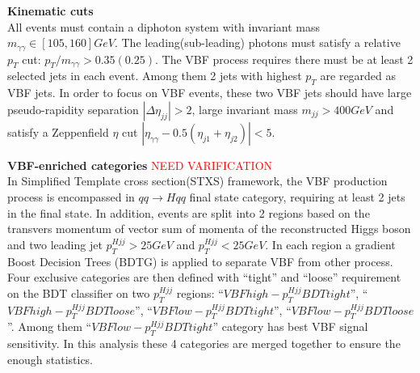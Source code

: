 \begin{description}
\item{\textbf{Kinematic cuts}} \\
All events must contain a diphoton system with invariant mass $m_{\gamma\gamma}\in[105, 160]GeV$. The leading(sub-leading) photons must satisfy a relative $p_{T}$ cut: $p_{T}/m_{\gamma\gamma}>0.35(0.25)$. 
The VBF process requires there must be at least 2 selected jets in each event. Among them 2 jets with highest $p_{T}$ are regarded as VBF jets. In order to focus on VBF events, these two VBF jets should have large pseudo-rapidity separation $|\Delta\eta_{jj}|>2$, large invariant mass $m_{jj}>400GeV$ and satisfy a Zeppenfield $\eta$ cut $|\eta_{\gamma\gamma}-0.5(\eta_{j1}+\eta_{j2})|<5$. 

\item{\textbf{VBF-enriched categories}} \textcolor{red}{NEED VARIFICATION} \\
In Simplified Template cross section(STXS) framework, the VBF production process is encompassed in $qq\to Hqq$ final state category, requiring at least 2 jets in the final state. In addition, events are split into 2 regions based on the transvers momentum of vector sum of momenta of the reconstructed Higgs boson and two leading jet $p_T^{Hjj}>25GeV$ and $p_T^{Hjj}<25GeV$. In each region a gradient Boost Decision Trees (BDTG) is applied to separate VBF from other process. Four exclusive categories are then defined with “tight” and “loose” requirement on the BDT classifier on two $ p_T^{Hjj}$ regions: “$VBF high- p_T^{Hjj} BDT tight$”, “$VBF high- p_T^{Hjj} BDT loose$”, “$VBF low- p_T^{Hjj} BDT tight$”, “$VBF low- p_T^{Hjj} BDT loose$”. Among them “$VBF low- p_T^{Hjj} BDT tight$” category has best VBF signal sensitivity. In this analysis these 4 categories are merged together to ensure the enough statistics. 
\end{description}

